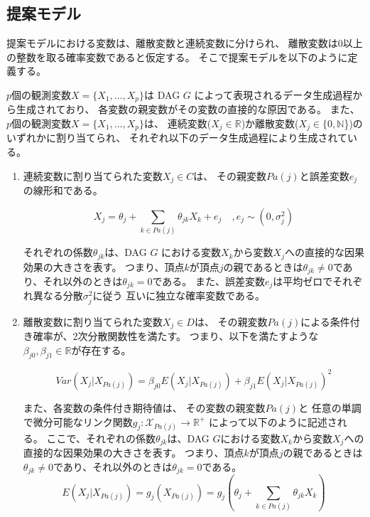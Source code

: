 
\subsection{提案モデル}

提案モデルにおける変数は、離散変数と連続変数に分けられ、
離散変数は0以上の整数を取る確率変数であると仮定する。
そこで提案モデルを以下のように定義する。

\begin{df}[提案モデル] \label{prop_model}
  $p$個の観測変数$X = \{ X_1, \dots, X_p \}$は
  DAG $G$ によって表現されるデータ生成過程から生成されており、
  各変数の親変数がその変数の直接的な原因である。
  また、$p$個の観測変数$X = \{ X_1, \dots, X_p \}$は、
  連続変数($X_j \in \mathbb R$)か離散変数($X_j \in \{0, \mathbb N$\})の
  いずれかに割り当てられ、
  それぞれ以下のデータ生成過程により生成されている。

  \begin{enumerate}
    \setlength{\itemsep}{0.3cm}
    \item
    連続変数に割り当てられた変数$X_j \in C$は、
    その親変数$Pa(j)$と誤差変数$e_j$の線形和である。

    \begin{equation}
      X_j = \theta_{j} + \sum_{k \in Pa(j)} \theta_{jk}X_k + e_j
      \quad , e_j \sim (0, \sigma_j^2)
      \label{eq:anm_prop}
    \end{equation}

    それぞれの係数$\theta_{jk}$は、DAG $G$ における変数$X_k$から変数$X_j$への直接的な因果効果の大きさを表す。
    つまり、頂点$k$が頂点$j$の親であるときは$\theta_{jk} \neq 0$であり、それ以外のときは$\theta_{jk} = 0$である。
    また、誤差変数$e_j$は平均ゼロでそれぞれ異なる分散$\sigma_j^2$に従う
    互いに独立な確率変数である。

    \item
    離散変数に割り当てられた変数$X_j \in D$は、
    その親変数$Pa(j)$による条件付き確率が、2次分散関数性を満たす。
    つまり、以下を満たすような$\beta_{j0},\beta_{j1} \in \mathbb{R}$が存在する。

    \begin{equation}
      \mathit{Var}(X_j|X_{Pa(j)}) = \beta_{j0} E(X_j | X_{Pa(j)}) + \beta_{j1} E(X_j | X_{Pa(j)})^2
      \label{QVF_prop}
    \end{equation}

    また、各変数の条件付き期待値は、
    その変数の親変数$Pa(j)$と
    任意の単調で微分可能なリンク関数$g_j \colon \mathcal X_{Pa(j)} \rightarrow \mathbb R^+$
    によって以下のように記述される。
    ここで、それぞれの係数$\theta_{jk}$は、DAG $G$における変数$X_k$から変数$X_j$への直接的な因果効果の大きさを表す。
    つまり、頂点$k$が頂点$j$の親であるときは$\theta_{jk} \neq 0$であり、それ以外のときは$\theta_{jk} = 0$である。
    \begin{equation}
      E(X_j | X_{Pa(j)})
      = g_j(X_{Pa(j)})
      = g_j \left(\theta_j + \sum_{k \in Pa(j)} \theta_{jk}X_k \right)
    \end{equation}

  \end{enumerate}
\end{df}


